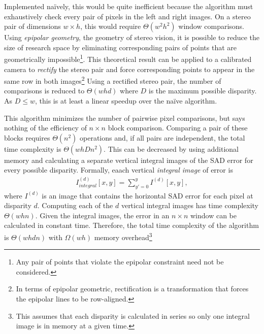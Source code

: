 \documentclass{article}
\begin{document}
Implemented na\"{i}vely, this would be quite inefficient because the algorithm
must exhaustively check every pair of pixels in the left and right images. On a
stereo pair of dimensions $w \times h$, this would require $\Theta(w^2 h^2)$
window comparisons. Using \textit{epipolar geometry}, the geometry of stereo
vision, it is possible to reduce the size of research space by eliminating
corresponding pairs of points that are geometrically impossible\footnote{Any
pair of points that violate the epipolar constraint need not be considered.}.
This theoretical result can be applied to a calibrated camera to
\textit{rectify} the stereo pair and force corresponding points to appear in
the same row in both images\footnote{In terms of epipolar geometric,
rectification is a transformation that forces the epipolar lines to be
row-aligned.} Using a rectified stereo pair, the number of comparisons is
reduced to $\Theta(w h d)$ where $D$ is the maximum possible disparity. As
$D \le w$, this is at least a linear speedup over the na\"{i}ve algorithm.

This algorithm minimizes the number of pairwise pixel comparisons, but says
nothing of the efficiency of $n \times n$ block comparison. Comparing a pair of
these blocks requires $\Theta(n^2)$ operations and, if all pairs are
independent, the total time complexity is $\Theta(w h D n^2)$. This can be
decreased by using additional memory and calculating a separate vertical
integral images of the SAD error for every possible disparity. Formally, eaach
vertical \textit{integral image} of error is
\begin{align*}
    I_{integral}^{(d)}[x, y] = \sum_{y' = 0}^y I^{(d)}[x, y],
\end{align*}
where $I^{(d)}$ is an image that contains the horizontal SAD error for each
pixel at disparity $d$. Computing each of the $d$ vertical integral images has
time complexity $\Theta(w h n)$. Given the integral images, the error in an $n
\times n$ window can be calculated in constant time. Therefore, the total time
complexity of the algorithm is $\Theta(w h d n)$ with $\Omega(w h)$ memory
overhead\footnote{This assumes that each disparity is calculated in series so
only one integral image is in memory at a given time.}
\end{document}
